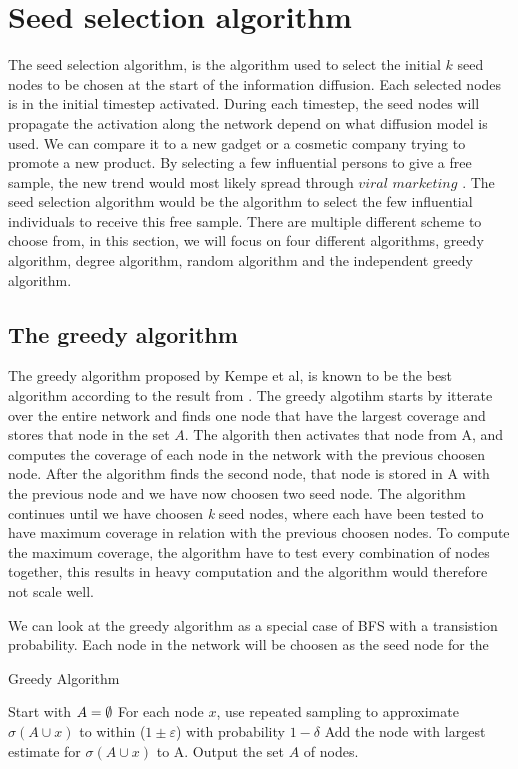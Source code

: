 \section{Seed selection algorithm}
The seed selection algorithm, is the algorithm used to select the initial $k$ seed nodes to be chosen at the start of the information diffusion. Each selected nodes is in the initial timestep activated. During each timestep, the seed nodes will propagate the activation along the network depend on what diffusion model is used. We can compare it to a new gadget or a cosmetic company trying to promote a new product. By selecting a few influential persons to give a free sample, the new trend would most likely  spread through $viral$ $marketing$ \cite{ViralMarketing}. The seed selection algorithm would be the algorithm to select the few influential individuals to receive this free sample. There are multiple different scheme to choose from, in this section, we will focus on four different algorithms, greedy algorithm, degree algorithm, random algorithm and the independent greedy algorithm.

\subsection{The greedy algorithm}
The greedy algorithm \cite{greedyInfluenc2005} proposed by Kempe et al, is known to be the best algorithm according to the result from  \cite{greedyInfluenc2005}. The greedy algotihm starts by itterate over the entire network and finds one node that have the largest coverage and stores that node in the set $A$. The algorith then activates that node from A, and computes the coverage of each node in the network with the previous choosen node. After the algorithm finds the second node, that node is stored in A with the previous node and we have now choosen two seed node. The algorithm continues until we have choosen \textit{k} seed nodes, where each have been tested to have maximum coverage in relation with the previous choosen nodes. To compute the maximum coverage, the algorithm have to test every combination of nodes together, this results in heavy computation and the algorithm would therefore not scale well.

We can look at the greedy algorithm as a special case of BFS with a transistion probability. Each node in the network will be choosen as the seed node for the

 \begin{algorithm}
\caption{Greedy Algorithm}
\begin{algorithmic}[1]
\State Start with $A = \emptyset$
\State For each node $x$, use repeated sampling to approximate $\sigma(A \cup {x}) $ to within ($1 \pm \varepsilon$) with probability
$1 − \delta$
\State Add the node with largest estimate for $\sigma(A \cup {x})$ to A.
\EndWhile
\State Output the set $A$ of nodes.
\end{algorithmic}
\end{algorithm}

